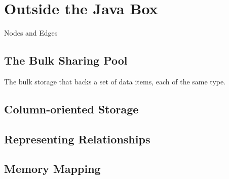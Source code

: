 \chapter{Outside the Java Box}
\label{chapter:outisde-java-box}

\begin{example}{Nodes and Edges}

\end{example}

\section{The Bulk Sharing Pool}
\label{sec:bulk-sharing-pool}

The
bulk storage that backs a set of data items, each of the same type.

\section{Column-oriented Storage}

\section{Representing Relationships}

\section{Memory Mapping}
